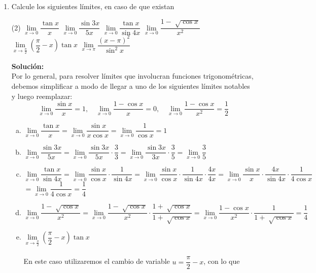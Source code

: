 \documentclass[12pt]{article}
\newenvironment{solucion}
{\begin{mdframed}[backgroundcolor=black!10]
		{\bf Solución:}\\
	}
	{
	\end{mdframed}
}
\newenvironment{preguntas}
{\begin{enumerate}\itemsep12pt
	}
	{
	\end{enumerate}
}
\newcommand{\ra}{\rightarrow}
\begin{document}
\begin{preguntas}
\item Calcule los siguientes límites, en caso de que existan
\begin{tasks}(2)
\task $\lim\limits_{x \ra 0} \dfrac{\tan x}{x}$ 
\task $\lim\limits_{x \ra 0} \dfrac{\sin 3x}{5x}$ 
\task $\lim\limits_{x \ra 0} \dfrac{\tan x}{\sin 4x}$ 
\task $\lim\limits_{x \ra 0} \dfrac{1 - \sqrt[]{\cos x}}{x^2}$ 
\task $\lim\limits_{x \ra \frac{\pi}{2}} \left(\dfrac{\pi}{2} - x \right) \tan x$ 
\task $\lim\limits_{x \ra \pi} \dfrac{(x - \pi)^2}{\sin ^2 x}$ 
\end{tasks}
\begin{solucion}
Por lo general, para resolver límites que involucran funciones trigonométricas, debemos simplificar a modo de llegar a uno de los siguientes límites notables y luego reemplazar:
	$$\lim\limits_{x \ra 0} \dfrac{\sin x}{x} = 1, \quad
	\lim\limits_{x \ra 0} \dfrac{1-\cos x}{x} = 0, \quad
	\lim\limits_{x \ra 0} \dfrac{1 - \cos x}{x^2} = \dfrac{1}{2}$$
\begin{enumerate}[a)]
\item $\lim\limits_{x \ra 0} \dfrac{\tan x}{x} = 
\lim\limits_{x \ra 0} \dfrac{\sin x}{x \cos x} = 
\lim\limits_{x \ra 0} \dfrac{1}{\cos x} = 1$ 
\item $\lim\limits_{x \ra 0} \dfrac{\sin 3x}{5x} = 
\lim\limits_{x \ra 0} \dfrac{\sin 3x}{5x} \cdot \dfrac{3}{3} =
\lim\limits_{x \ra 0} \dfrac{\sin 3x}{3x} \cdot \dfrac{3}{5} = 
\lim\limits_{x \ra 0} \dfrac{3}{5}$ 
\item $\lim\limits_{x \ra 0} \dfrac{\tan x}{\sin 4x} =
\lim\limits_{x \ra 0} \dfrac{\sin x}{\cos x} \cdot \dfrac{1}{\sin 4x} =
\lim\limits_{x \ra 0} \dfrac{\sin x}{\cos x} \cdot \dfrac{1}{\sin 4x} \cdot \dfrac{4x}{4x}  =
\lim\limits_{x \ra 0} \dfrac{\sin x}{x} \cdot \dfrac{4x}{\sin 4x} \cdot \dfrac{1}{4\cos x} $ \\
$=\lim\limits_{x \ra 0} \dfrac{1}{4\cos x} = \dfrac{1}{4}$
\item $\lim\limits_{x \ra 0} \dfrac{1 - \sqrt[]{\cos x}}{x^2} =
\lim\limits_{x \ra 0} \dfrac{1 - \sqrt[]{\cos x}}{x^2} \cdot \dfrac{1 + \sqrt[]{\cos x}}{1 + \sqrt[]{\cos x}} =
\lim\limits_{x \ra 0} \dfrac{1 - \cos x}{x^2} \cdot \dfrac{1}{1 + \sqrt[]{\cos x}} = \dfrac{1}{4}$ 
\item $\lim\limits_{x \ra \frac{\pi}{2}} \left(\dfrac{\pi}{2} - x \right) \tan x$\\
\\
En este caso utilizaremos el cambio de variable $u = \dfrac{\pi}{2} - x$, con lo que

\end{enumerate}
\end{solucion}
\end{preguntas}
\end{document}
